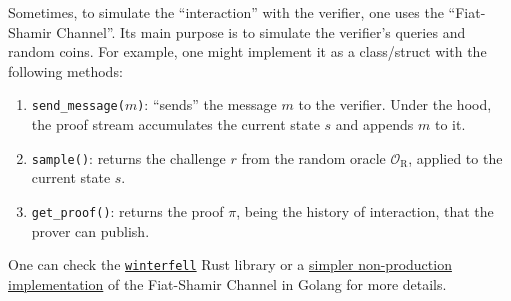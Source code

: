 \documentclass[../lecture-notes-148x210.tex]{subfiles}
\begin{document}
\begin{remark}
    Sometimes, to simulate the ``interaction'' with the verifier, one uses the ``Fiat-Shamir Channel''. Its main purpose is to simulate the verifier's queries and random coins. For example, one might implement it as a class/struct with the following methods:
    \begin{enumerate}
        \item \texttt{send\_message($m$)}: ``sends'' the message $m$ to the verifier. Under the hood, the proof stream accumulates the current state $s$ and appends $m$ to it.
        \item \texttt{sample()}: returns the challenge $r$ from the random oracle $\mathcal{O}_{\text{R}}$, applied to the current state $s$.
        \item \texttt{get\_proof()}: returns the proof $\pi$, being the history of interaction, that the prover can publish.
    \end{enumerate}

    One can check the \href{https://github.com/facebook/winterfell/blob/main/prover/src/channel.rs}{\texttt{winterfell}} Rust library or a \href{https://github.com/actuallyachraf/zkstarks/blob/master/fs.go}{simpler non-production implementation} of the Fiat-Shamir Channel in Golang for more details.
\end{remark}
\end{document}
